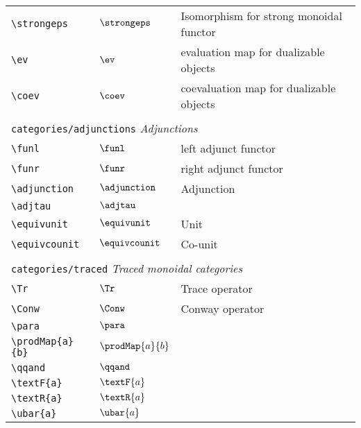 \begin{longtable}{lll}
 {\color[rgb]{0.5,0.5,0.5}\texttt{\textbackslash strongeps}} & $\strongeps$ &  Isomorphism for strong monoidal functor\\ 
 {\color[rgb]{0.5,0.5,0.5}\texttt{\textbackslash ev}} & $\ev$ &  evaluation map for dualizable objects\\ 
 {\color[rgb]{0.5,0.5,0.5}\texttt{\textbackslash coev}} & $\coev$ &  coevaluation map for dualizable objects\\ 
  &  & \\ 
 \multicolumn{3}{l}{{\color[rgb]{0.5,0.5,0.5}\texttt{categories/adjunctions}} \emph{Adjunctions}}\\ 
 \hline
{\color[rgb]{0.5,0.5,0.5}\texttt{\textbackslash funl}} & $\funl$ &  left adjunct functor\\ 
 {\color[rgb]{0.5,0.5,0.5}\texttt{\textbackslash funr}} & $\funr$ &  right adjunct functor\\ 
 {\color[rgb]{0.5,0.5,0.5}\texttt{\textbackslash adjunction}} & $\adjunction$ &  Adjunction\\ 
 {\color[rgb]{0.5,0.5,0.5}\texttt{\textbackslash adjtau}} & $\adjtau$ & \\ 
 {\color[rgb]{0.5,0.5,0.5}\texttt{\textbackslash equivunit}} & $\equivunit$ &  Unit\\ 
 {\color[rgb]{0.5,0.5,0.5}\texttt{\textbackslash equivcounit}} & $\equivcounit$ &  Co-unit\\ 
  &  & \\ 
 \multicolumn{3}{l}{{\color[rgb]{0.5,0.5,0.5}\texttt{categories/traced}} \emph{Traced monoidal categories}}\\ 
 \hline
{\color[rgb]{0.5,0.5,0.5}\texttt{\textbackslash Tr}} & $\Tr$ &  Trace operator\\ 
 {\color[rgb]{0.5,0.5,0.5}\texttt{\textbackslash Conw}} & $\Conw$ &  Conway operator\\ 
 {\color[rgb]{0.5,0.5,0.5}\texttt{\textbackslash para}} & $\para$ & \\ 
 {\color[rgb]{0.5,0.5,0.5}\texttt{\textbackslash prodMap\{a\}\{b\}}} & $\prodMap{a}{b}$ & \\ 
 {\color[rgb]{0.5,0.5,0.5}\texttt{\textbackslash qqand}} & $\qqand$ & \\ 
 {\color[rgb]{0.5,0.5,0.5}\texttt{\textbackslash textF\{a\}}} & $\textF{a}$ & \\ 
 {\color[rgb]{0.5,0.5,0.5}\texttt{\textbackslash textR\{a\}}} & $\textR{a}$ & \\ 
 {\color[rgb]{0.5,0.5,0.5}\texttt{\textbackslash ubar\{a\}}} & $\ubar{a}$ & \\ 

\end{longtable}
